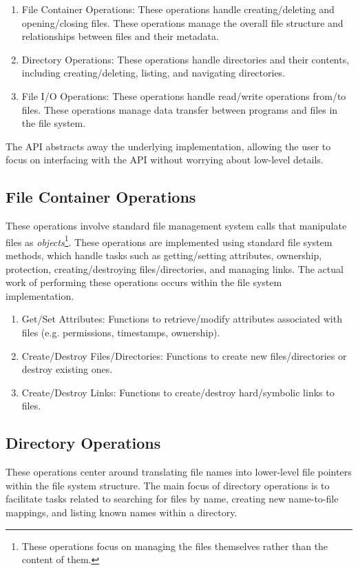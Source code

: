 \documentclass{report}
\begin{document}
\begin{enumerate}[label=\textit{(\roman*)}]
\item File Container Operations: These operations handle creating/deleting and opening/closing files. These operations manage
  the overall file structure and relationships between files and their metadata.
\item Directory Operations: These operations handle directories and their contents, including
  creating/deleting, listing, and navigating directories.
\item File I/O Operations: These operations handle read/write operations from/to files. These
  operations manage data transfer between programs and files in the file system.
\end{enumerate}

The API abstracts away the underlying implementation, allowing the user to focus on interfacing
with the API without worrying about low-level details.


\subsection{File Container Operations}
\label{subsec:FCO}
These operations involve standard file management system calls that manipulate files as
\textit{objects}\footnote{These operations focus on managing the files themselves rather than the
  content of them.}. These operations are implemented using standard file system methods, which
handle tasks such as getting/setting attributes, ownership, protection, creating/destroying
files/directories, and managing links. The actual work of performing these operations occurs within
the file system implementation.

\begin{enumerate}[label=\textit{(\roman*)}]
\item Get/Set Attributes: Functions to retrieve/modify attributes associated with files
(e.g. permissions, timestamps, ownership).
\item Create/Destroy Files/Directories: Functions to create new files/directories or destroy
existing ones.
\item Create/Destroy Links: Functions to create/destroy hard/symbolic links to files.
\end{enumerate}


\subsection{Directory Operations}
These operations center around translating file names into lower-level file pointers within the file
system structure. The main focus of directory operations is to facilitate tasks related to searching
for files by name, creating new name-to-file mappings, and listing known names within a directory.
\end{document}
